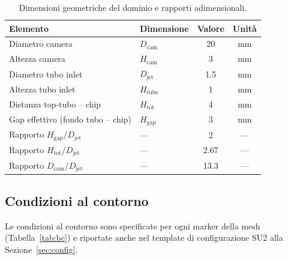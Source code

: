 \documentclass[11pt,a4paper]{article}
\newcommand{\Djet}{D_{\mathrm{jet}}}
\newcommand{\Dcam}{D_{\mathrm{cam}}}
\newcommand{\Hcam}{H_{\mathrm{cam}}}
\begin{document}
\begin{table}[H]
  \centering
  \caption{Dimensioni geometriche del dominio e rapporti adimensionali.}
  \label{tab:geometria}
  \begin{tabular}{llcc}
    \toprule
    \rowcolor{tablehead}
    \textbf{Elemento} & \textbf{Dimensione} & \textbf{Valore} & \textbf{Unità} \\
    \midrule
    Diametro camera      & $\Dcam$               & 20              & mm \\
    Altezza camera       & $\Hcam$               & 3               & mm \\
    Diametro tubo inlet  & $\Djet$               & 1.5             & mm \\
    Altezza tubo inlet   & $H_{\mathrm{tube}}$   & 1               & mm \\
    Distanza top-tubo -- chip & $H_{\mathrm{tot}}$ & 4            & mm \\
    Gap effettivo (fondo tubo -- chip) & $H_{\mathrm{gap}}$ & 3 & mm \\
    Rapporto $H_{\mathrm{gap}}/\Djet$ & ---        & 2               & --- \\
    Rapporto $H_{\mathrm{tot}}/\Djet$ & ---        & 2.67            & --- \\
    Rapporto $\Dcam/\Djet$            & ---        & 13.3            & --- \\
    \bottomrule
  \end{tabular}
\end{table}

\subsection{Condizioni al contorno}

Le condizioni al contorno sono specificate per ogni marker della mesh (Tabella~\ref{tab:bc}) e riportate anche nel template di configurazione SU2 alla Sezione~\ref{sec:config}.
\end{document}
